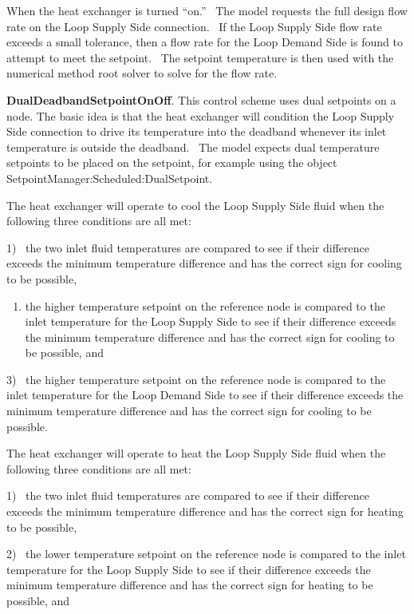 When the heat exchanger is turned ``on.''~ The model requests the full design flow rate on the Loop Supply Side connection.~ If the Loop Supply Side flow rate exceeds a small tolerance, then a flow rate for the Loop Demand Side is found to attempt to meet the setpoint.~ The setpoint temperature is then used with the numerical method root solver to solve for the flow rate.

\textbf{DualDeadbandSetpointOnOff}. This control scheme uses dual setpoints on a node. The basic idea is that the heat exchanger will condition the Loop Supply Side connection to drive its temperature into the deadband whenever its inlet temperature is outside the deadband.~ The model expects dual temperature setpoints to be placed on the setpoint, for example using the object SetpointManager:Scheduled:DualSetpoint.

The heat exchanger will operate to cool the Loop Supply Side fluid when the following three conditions are all met:

1)~ the two inlet fluid temperatures are compared to see if their difference exceeds the minimum temperature difference and has the correct sign for cooling to be possible,

\begin{enumerate}
\def\labelenumi{\arabic{enumi})}
\setcounter{enumi}{1}
\tightlist
\item
  the higher temperature setpoint on the reference node is compared to the inlet temperature for the Loop Supply Side to see if their difference exceeds the minimum temperature difference and has the correct sign for cooling to be possible, and
\end{enumerate}

3)~ the higher temperature setpoint on the reference node is compared to the inlet temperature for the Loop Demand Side to see if their difference exceeds the minimum temperature difference and has the correct sign for cooling to be possible.

The heat exchanger will operate to heat the Loop Supply Side fluid when the following three conditions are all met:

1)~ the two inlet fluid temperatures are compared to see if their difference exceeds the minimum temperature difference and has the correct sign for heating to be possible,

2)~ the lower temperature setpoint on the reference node is compared to the inlet temperature for the Loop Supply Side to see if their difference exceeds the minimum temperature difference and has the correct sign for heating to be possible, and

